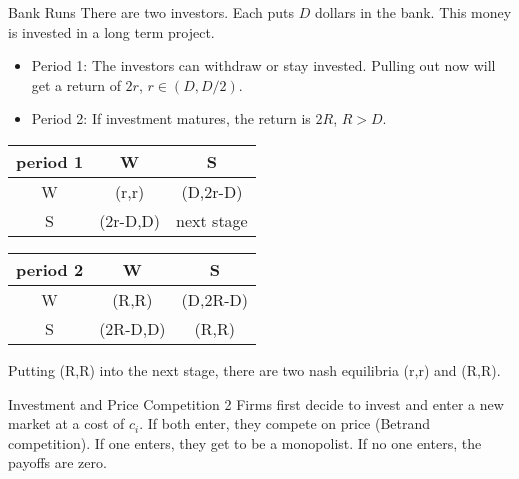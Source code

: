 \begin{aexample}{Bank Runs}{}
    There are two investors. Each puts $D$ dollars in the bank. This money is invested in a long term project.
    
    \begin{itemize}
        \item Period 1: The investors can withdraw or stay invested. Pulling out now will get a return of $2r$, $r\in (D,D/2)$.
        \item Period 2: If investment matures, the return is $2R$, $R>D$.
    \end{itemize}
    \begin{center}
    \begin{tabular}{|c|c c|}
        \hline period 1& W & S\\
            \hline  W & (r,r) & (D,2r-D)\\ \hline S& (2r-D,D) & next stage\\ \hline
    \end{tabular}
\end{center}
\begin{center}
    \begin{tabular}{|c|c c|}
        \hline period 2 & W & S\\
            \hline  W & (R,R) & (D,2R-D)\\ \hline S& (2R-D,D) & (R,R)\\ \hline
    \end{tabular}
\end{center}
\end{aexample}
Putting (R,R) into the next stage, there are two nash equilibria (r,r) and (R,R).

\begin{aexample}{Investment and Price Competition}{}
    2 Firms first decide to invest and enter a new market at a cost of $c_i$. If both enter, they compete on price (Betrand competition). If one enters, they get to be a monopolist. If no one enters, the payoffs are zero.
\end{aexample}

